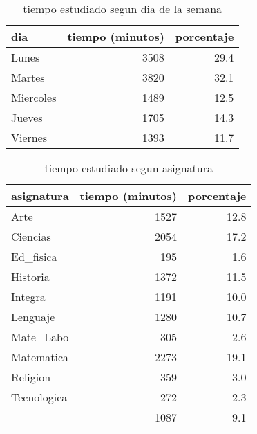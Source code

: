 \documentclass[spanish]{article}
\begin{document}
\begin{table}[h!]
\begin{center}
\begin{tabular}{|l|r|r|}
\hline
dia       & tiempo (minutos) & porcentaje   \\ \hline
Lunes     &             3508 &          29.4\\ \hline
Martes    &             3820 &          32.1\\ \hline
Miercoles &             1489 &          12.5\\ \hline
Jueves    &             1705 &          14.3\\ \hline
Viernes   &             1393 &          11.7\\ \hline
\end{tabular}
\caption{tiempo estudiado segun dia de la semana}
\end{center}
\end{table}

\begin{table}[h!]
\begin{center}
\begin{tabular}{|l|r|r|}
\hline
asignatura  & tiempo (minutos) & porcentaje   \\ \hline
Arte        &             1527 &          12.8\\ \hline
Ciencias    &             2054 &          17.2\\ \hline
Ed\_fisica   &              195 &           1.6\\ \hline
Historia    &             1372 &          11.5\\ \hline
Integra     &             1191 &          10.0\\ \hline
Lenguaje    &             1280 &          10.7\\ \hline
Mate\_Labo   &              305 &           2.6\\ \hline
Matematica  &             2273 &          19.1\\ \hline
Religion    &              359 &           3.0\\ \hline
Tecnologica &              272 &           2.3\\ \hline
            &             1087 &           9.1\\ \hline
\end{tabular}
\caption{tiempo estudiado segun asignatura}
\end{center}
\end{table}
\end{document}
